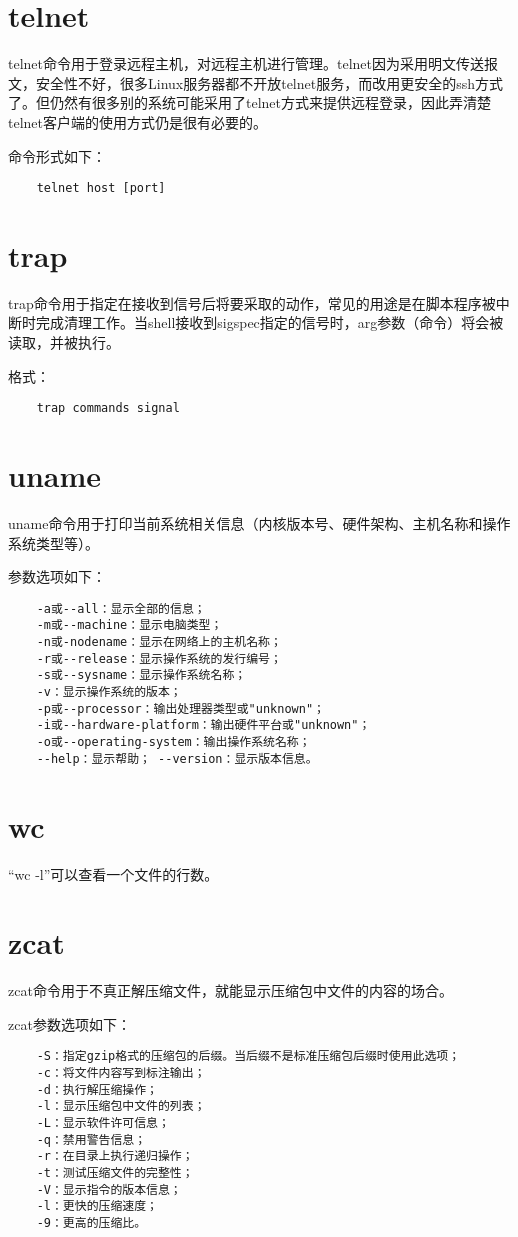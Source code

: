 \documentclass[a4paper,left=2.5cm,right=2.5cm,11pt]{article}
\begin{document}
\section{telnet}
	telnet命令用于登录远程主机，对远程主机进行管理。telnet因为采用明文传送报文，安全性不好，很多Linux服务器都不开放telnet服务，而改用更安全的ssh方式了。但仍然有很多别的系统可能采用了telnet方式来提供远程登录，因此弄清楚telnet客户端的使用方式仍是很有必要的。\par

	命令形式如下：
	\begin{lstlisting}
	telnet host [port]
	\end{lstlisting}

\section{trap}
	trap命令用于指定在接收到信号后将要采取的动作，常见的用途是在脚本程序被中断时完成清理工作。当shell接收到sigspec指定的信号时，arg参数（命令）将会被读取，并被执行。\par

	格式：
	\begin{lstlisting}
	trap commands signal
	\end{lstlisting}

\section{uname}
	uname命令用于打印当前系统相关信息（内核版本号、硬件架构、主机名称和操作系统类型等）。\par

	参数选项如下：
	\begin{lstlisting}
	-a或--all：显示全部的信息； 
	-m或--machine：显示电脑类型； 
	-n或-nodename：显示在网络上的主机名称； 
	-r或--release：显示操作系统的发行编号； 
	-s或--sysname：显示操作系统名称； 
	-v：显示操作系统的版本； 
	-p或--processor：输出处理器类型或"unknown"； 
	-i或--hardware-platform：输出硬件平台或"unknown"； 
	-o或--operating-system：输出操作系统名称； 
	--help：显示帮助； --version：显示版本信息。
	\end{lstlisting}

\section{wc}
	“wc -l”可以查看一个文件的行数。

\section{zcat}
	zcat命令用于不真正解压缩文件，就能显示压缩包中文件的内容的场合。\par

	zcat参数选项如下：
	\begin{lstlisting}
	-S：指定gzip格式的压缩包的后缀。当后缀不是标准压缩包后缀时使用此选项； 
	-c：将文件内容写到标注输出； 
	-d：执行解压缩操作； 
	-l：显示压缩包中文件的列表； 
	-L：显示软件许可信息； 
	-q：禁用警告信息； 
	-r：在目录上执行递归操作； 
	-t：测试压缩文件的完整性； 
	-V：显示指令的版本信息； 
	-l：更快的压缩速度； 
	-9：更高的压缩比。
	\end{lstlisting}
\end{document}
